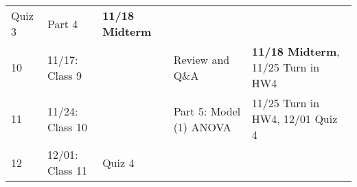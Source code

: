 \documentclass[
]{book}
\begin{document}
\begin{longtable}[]{@{}lllll@{}}
\begin{minipage}[t]{0.08\columnwidth}
Quiz 3\strut
\end{minipage} & \begin{minipage}[t]{0.32\columnwidth}\raggedright
Part 4\strut
\end{minipage} & \begin{minipage}[t]{0.22\columnwidth}\raggedright
\textbf{11/18 Midterm}\strut
\end{minipage}\tabularnewline
\begin{minipage}[t]{0.08\columnwidth}\raggedright
10\strut
\end{minipage} & \begin{minipage}[t]{0.17\columnwidth}\raggedright
11/17: Class 9\strut
\end{minipage} & \begin{minipage}[t]{0.08\columnwidth}\raggedright
\strut
\end{minipage} & \begin{minipage}[t]{0.32\columnwidth}\raggedright
Review and Q\&A\strut
\end{minipage} & \begin{minipage}[t]{0.22\columnwidth}\raggedright
\textbf{11/18 Midterm}, 11/25 Turn in HW4\strut
\end{minipage}\tabularnewline
\begin{minipage}[t]{0.08\columnwidth}\raggedright
11\strut
\end{minipage} & \begin{minipage}[t]{0.17\columnwidth}\raggedright
11/24: Class 10\strut
\end{minipage} & \begin{minipage}[t]{0.08\columnwidth}\raggedright
\strut
\end{minipage} & \begin{minipage}[t]{0.32\columnwidth}\raggedright
Part 5: Model (1) ANOVA\strut
\end{minipage} & \begin{minipage}[t]{0.22\columnwidth}\raggedright
11/25 Turn in HW4, 12/01 Quiz 4\strut
\end{minipage}\tabularnewline
\begin{minipage}[t]{0.08\columnwidth}\raggedright
12\strut
\end{minipage} & \begin{minipage}[t]{0.17\columnwidth}\raggedright
12/01: Class 11\strut
\end{minipage} & \begin{minipage}[t]{0.08\columnwidth}\raggedright
Quiz 4\strut
\end{minipage} & \begin{minipage}[t]{0.32\columnwidth}\raggedright

\end{minipage}
\end{longtable}
\end{document}
